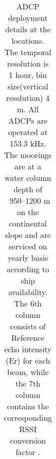 \documentclass{article}
\begin{document}
\linespread{1} 	
\begin{table}[htbp]

	{\footnotesize

		\captionsetup{justification=justified,font=footnotesize,skip=0.05\baselineskip} %
		\caption{ADCP deployment details at the locations. The temporal resolution is 1 hour, bin size(vertical resolution) 4 m. All ADCPs are operated at 153.3 kHz. The moorings are at a water column depth of ~950--1200 m on the continental slope and are serviced on yearly basis according to ship availability. The 6th column consists of Reference echo intensity (Er) for each beam, while the 7th column contains the corresponding RSSI conversion factor \citep{deines1999backscatter}.}
		\begin{adjustwidth}{0in}{0in} 
			\begin{tabular}{ccccccc}
				

\end{tabular}
\end{adjustwidth}}
\end{table}
\end{document}
